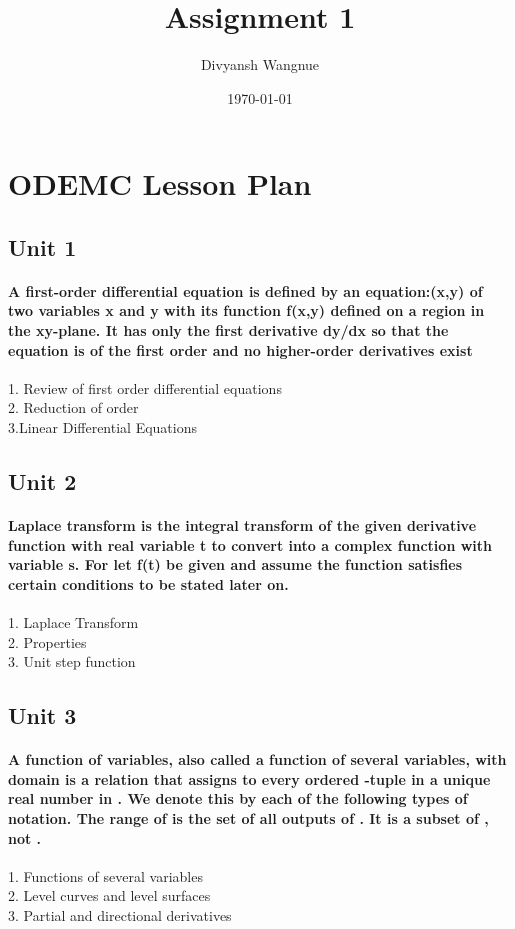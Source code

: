 \documentclass[12pt]{article}
\title{Assignment 1}
\author{Divyansh Wangnue}
\date{\today}
\begin{document}
\maketitle
{}
\newpage
{}
\section{ODEMC Lesson Plan}
\subsection{Unit 1}
\paragraph{A first-order differential equation is defined by an equation:(x,y) of two variables x and y with its function f(x,y) defined on a region in the xy-plane. It has only the first derivative dy/dx so that the equation is of the first order and no higher-order derivatives exist}
1. Review of first order differential equations\\
2. Reduction of order\\
3.Linear Differential Equations\\
\subsection{Unit 2}
\paragraph{Laplace transform is the integral transform of the given derivative function with real variable t to convert into a complex function with variable s. For  let f(t) be given and assume the function satisfies certain conditions to be stated later on.}
1. Laplace Transform\\
2. Properties\\
3. Unit step function\\
\subsection{Unit 3}
\paragraph{A function of variables, also called a function of several variables, with domain is a relation that assigns to every ordered -tuple in a unique real number in . We denote this by each of the following types of notation. The range of is the set of all outputs of . It is a subset of , not .}
1. Functions of several variables \\
2. Level curves and level surfaces\\
3. Partial and directional derivatives\\
\end{document}
